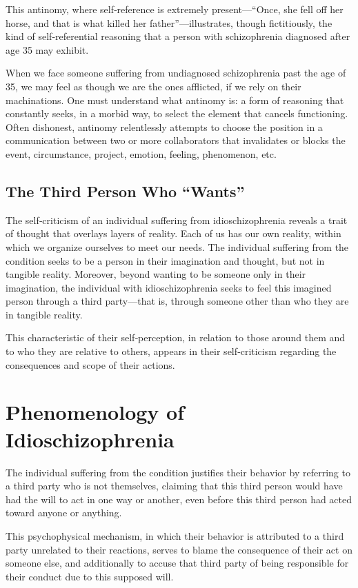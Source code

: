 \documentclass[12pt,oneside]{article}
\begin{document}
This antinomy, where self‑reference is extremely present—“Once, she fell off her horse, and that is what killed her father”—illustrates, though fictitiously, the kind of self‑referential reasoning that a person with schizophrenia diagnosed after age 35 may exhibit.

When we face someone suffering from undiagnosed schizophrenia past the age of 35, we may feel as though we are the ones afflicted, if we rely on their machinations. One must understand what antinomy is: a form of reasoning that constantly seeks, in a morbid way, to select the element that cancels functioning. Often dishonest, antinomy relentlessly attempts to choose the position in a communication between two or more collaborators that invalidates or blocks the event, circumstance, project, emotion, feeling, phenomenon, etc.

\subsection{The Third Person Who “Wants”}

The self‑criticism of an individual suffering from idioschizophrenia reveals a trait of thought that overlays layers of reality. Each of us has our own reality, within which we organize ourselves to meet our needs. The individual suffering from the condition seeks to be a person in their imagination and thought, but not in tangible reality. Moreover, beyond wanting to be someone only in their imagination, the individual with idioschizophrenia seeks to feel this imagined person through a third party—that is, through someone other than who they are in tangible reality.

This characteristic of their self‑perception, in relation to those around them and to who they are relative to others, appears in their self‑criticism regarding the consequences and scope of their actions.

\section{Phenomenology of Idioschizophrenia}

The individual suffering from the condition justifies their behavior by referring to a third party who is not themselves, claiming that this third person would have had the will to act in one way or another, even before this third person had acted toward anyone or anything.

This psychophysical mechanism, in which their behavior is attributed to a third party unrelated to their reactions, serves to blame the consequence of their act on someone else, and additionally to accuse that third party of being responsible for their conduct due to this supposed will.
\end{document}
